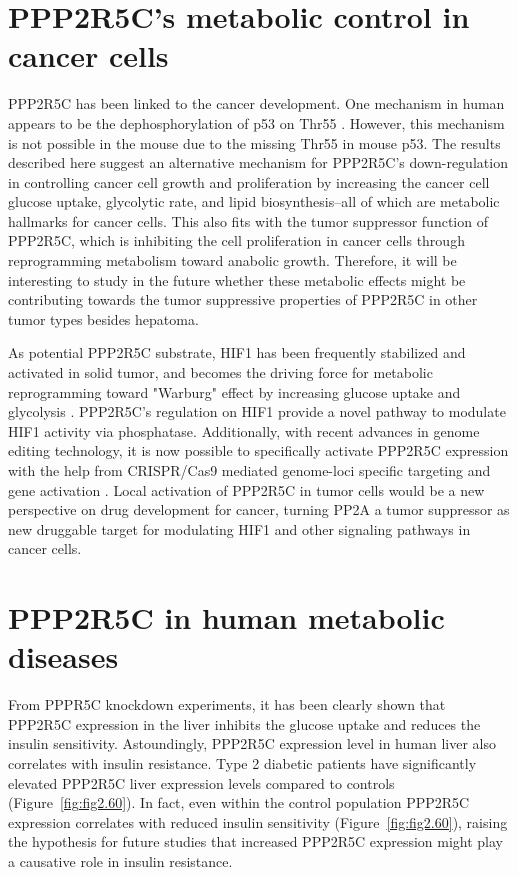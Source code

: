 \section{PPP2R5C's metabolic control in cancer cells}

PPP2R5C has been linked to the cancer development. One mechanism in human appears to be the dephosphorylation of p53 on Thr55 \cite{li_specific_2007,shouse_serine_2008,nobumori_b56_2013}. However, this mechanism is not possible in the mouse due to the missing Thr55 in mouse p53. The results described here suggest an alternative mechanism for PPP2R5C's down-regulation in controlling cancer cell growth and proliferation by increasing the cancer cell glucose uptake, glycolytic rate, and lipid biosynthesis--all of which are metabolic hallmarks for cancer cells. This also fits with the tumor suppressor function of PPP2R5C, which is inhibiting the cell proliferation in cancer cells through reprogramming metabolism toward anabolic growth. Therefore, it will be interesting to study in the future whether these metabolic effects might be contributing towards the tumor suppressive properties of PPP2R5C in other tumor types besides hepatoma. 

As potential PPP2R5C substrate, HIF1\textalpha{} has been frequently stabilized and activated in solid tumor, and becomes the driving force for metabolic reprogramming toward "Warburg" effect by increasing glucose uptake and glycolysis \cite{denko_hypoxia_2008}. PPP2R5C's regulation on HIF1\textalpha{} provide a novel pathway to modulate HIF1\textalpha{} activity via phosphatase. Additionally, with recent advances in genome editing technology, it is now possible to specifically activate PPP2R5C expression with the help from CRISPR/Cas9 mediated genome-loci specific targeting and gene activation \cite{konermann_genome-scale_2014,qi_repurposing_2013}. Local activation of PPP2R5C in tumor cells would be a new perspective on drug development for cancer, turning PP2A a tumor suppressor as new druggable target for modulating HIF1\textalpha{} and other signaling pathways in cancer cells.

\section{PPP2R5C in human metabolic diseases}

From PPPR5C knockdown experiments, it has been clearly shown that PPP2R5C expression in the liver inhibits the glucose uptake and reduces the insulin sensitivity. Astoundingly, PPP2R5C expression level in human liver also correlates with insulin resistance. Type 2 diabetic patients have significantly elevated PPP2R5C liver expression levels compared to controls (Figure~\ref{fig:fig2.60}). In fact, even within the control population PPP2R5C expression correlates with reduced insulin sensitivity (Figure~\ref{fig:fig2.60}), raising the hypothesis for future studies that increased PPP2R5C expression might play a causative role in insulin resistance.

